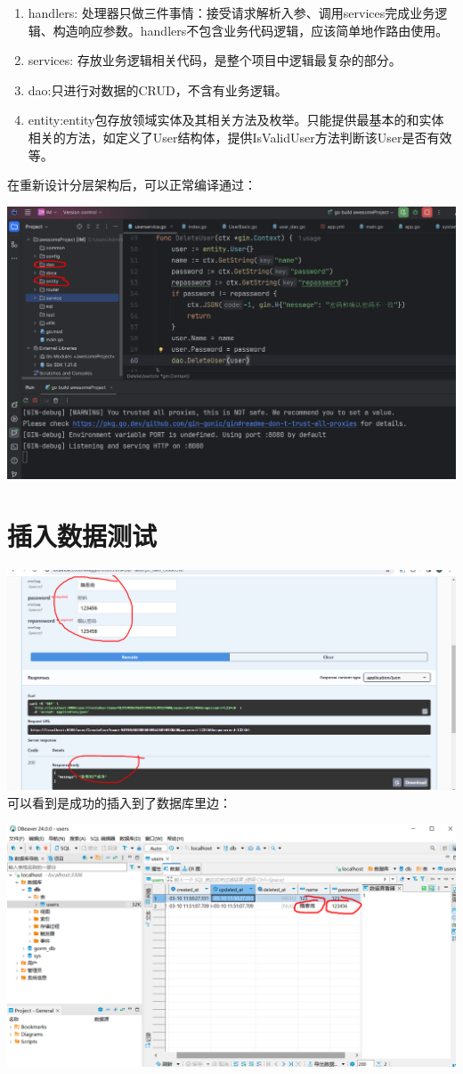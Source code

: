 \documentclass[12pt]{article}
\begin{document}
	\begin{enumerate}
		\item handlers: 处理器只做三件事情：接受请求解析入参、调用services完成业务逻辑、构造响应参数。handlers不包含业务代码逻辑，应该简单地作路由使用。
		\item services: 存放业务逻辑相关代码，是整个项目中逻辑最复杂的部分。
		\item dao:只进行对数据的CRUD，不含有业务逻辑。
		\item entity:entity包存放领域实体及其相关方法及枚举。只能提供最基本的和实体相关的方法，如定义了User结构体，提供IsValidUser方法判断该User是否有效等。
	\end{enumerate}
	
	在重新设计分层架构后，可以正常编译通过：
	
	\includegraphics[scale=0.5]{8.png}
	
	\section{插入数据测试}
	\includegraphics{9.png}
	可以看到是成功的插入到了数据库里边：
	
	\includegraphics[scale=0.7]{10.png}
\end{document}
